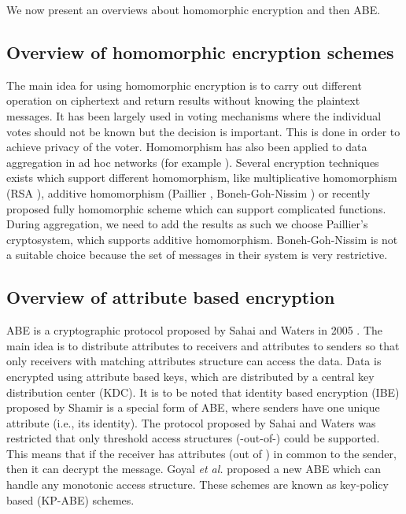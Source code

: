 \documentclass[conference]{IEEEtran}[10pt]
\begin{document}
We now present an overviews about homomorphic encryption and then ABE. 

\subsection{Overview of homomorphic encryption schemes}
\label{subsec:homomorphic}
The main idea for using homomorphic encryption is to carry out different operation on ciphertext and return results without knowing
the plaintext messages. It has been largely used in voting mechanisms where the individual votes should not be known but the decision is 
important. This is done in order to achieve privacy of the voter. 
Homomorphism has also been applied to data aggregation in ad hoc networks (for example \cite{CCMT09}).
Several encryption techniques exists which support different homomorphism, like multiplicative homomorphism 
(RSA \cite{RSA83}), additive homomorphism (Paillier \cite{P99}, Boneh-Goh-Nissim \cite{BGN05}) or recently proposed
fully homomorphic scheme \cite{G09} which can support complicated functions. 
During aggregation, we need to add the results as such we choose Paillier's cryptosystem, which supports additive homomorphism. 
Boneh-Goh-Nissim \cite{BGN05} is not a suitable choice because the set of messages in their system is very restrictive. 


\subsection{Overview of attribute based encryption}
\label{subsec:abe}
ABE is a cryptographic protocol proposed by Sahai and Waters in 2005 \cite{SW05}.
The main idea is to distribute attributes to receivers and attributes to senders so that only receivers 
with matching  attributes structure can access the data.  
Data is encrypted using attribute based keys, which are distributed by a central key distribution center (KDC). 
It is to be noted that identity based encryption (IBE) proposed by Shamir \cite{S84} is a special form
of ABE, where senders have one unique attribute (i.e., its identity). 
The protocol proposed by Sahai and Waters was restricted that only threshold access structures (-out-of-) could be supported. 
This means that if the receiver has  attributes (out of ) in common to the sender, then it can decrypt the message. 
Goyal \emph{et al.} \cite{GPSW06} proposed a new ABE which can handle any monotonic access structure. 
These schemes are known as key-policy based (KP-ABE) schemes. 
\end{document}
